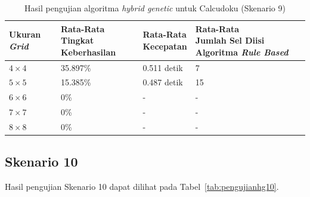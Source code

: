 \begin{table}
\centering
\captionsetup{justification=centering}
\caption[Hasil pengujian algoritma \textit{hybrid genetic} untuk Calcudoku (Skenario 9)]{Hasil pengujian algoritma \textit{hybrid genetic} untuk Calcudoku (Skenario 9)}
\begin{tabular}{| l | l | l | l |}
\hline
Ukuran \textit{Grid} & \makecell[l]{Rata-Rata \\ Tingkat Keberhasilan} & \makecell[l]{Rata-Rata \\ Kecepatan} & \makecell[l]{Rata-Rata \\ Jumlah Sel Diisi Algoritma \textit{Rule Based}} \\
\hline \hline
\begin{math}4 \times 4\end{math} & 35.897\% & 0.511 detik & 7 \\
\hline
\begin{math}5 \times 5\end{math} & 15.385\% & 0.487 detik & 15 \\
\hline
\begin{math}6 \times 6\end{math} & 0\% & - & - \\
\hline
\begin{math}7 \times 7\end{math} & 0\% & - & - \\
\hline
\begin{math}8 \times 8\end{math} & 0\% & - & - \\
\hline
\end{tabular}
\label{tab:pengujianhg9}
\end{table}

\subsection{Skenario 10}
\label{sec:skenario10}

Hasil pengujian Skenario 10 dapat dilihat pada Tabel~\ref{tab:pengujianhg10}.

